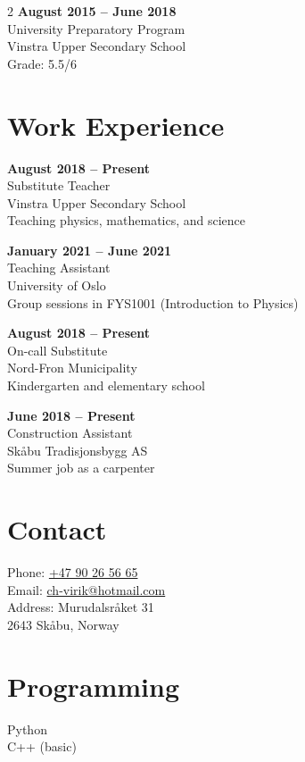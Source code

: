 \documentclass[a4paper,10pt]{article}
\begin{document}
\begin{paracol}{2}
\textbf{August 2015 -- June 2018} \\
University Preparatory Program \\
Vinstra Upper Secondary School \\
Grade: 5.5/6

\section*{Work Experience}

\textbf{August 2018 -- Present} \\
Substitute Teacher \\
Vinstra Upper Secondary School \\
Teaching physics, mathematics, and science

\vspace{0.3cm}

\textbf{January 2021 -- June 2021} \\
Teaching Assistant \\
University of Oslo \\
Group sessions in FYS1001 (Introduction to Physics)

\vspace{0.3cm}

\textbf{August 2018 -- Present} \\
On-call Substitute \\
Nord-Fron Municipality \\
Kindergarten and elementary school

\vspace{0.3cm}

\textbf{June 2018 -- Present} \\
Construction Assistant \\
Skåbu Tradisjonsbygg AS \\
Summer job as a carpenter

\switchcolumn

\section*{Contact}
Phone: \href{tel:+4790265665}{+47 90 26 56 65} \\
Email: \href{mailto:ch-virik@hotmail.com}{ch-virik@hotmail.com} \\
Address: Murudalsråket 31 \\
2643 Skåbu, Norway

\section*{Programming}
Python \\
C++ (basic)


\end{paracol}
\end{document}
